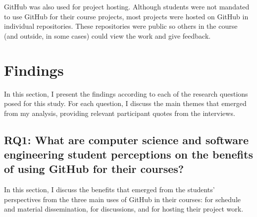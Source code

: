 GitHub was also used for project hosting. Although students were not mandated to use GitHub for their course projects, most projects were hosted on GitHub in individual repositories. These repositories were public so others in the course (and outside, in some cases) could view the work and give feedback. %

\section{Findings}

In this section, I present the findings according to each of the research questions posed for this study. For each question, I discuss the main themes that emerged from my analysis, providing relevant participant quotes from the interviews.




\subsection{RQ1: What are computer science and software engineering student perceptions on the benefits of using GitHub for their courses?}
In this section, I discuss the benefits that emerged from the students' perspectives from the three main uses of GitHub in their courses: for schedule and material dissemination, for discussions, and for hosting their project work. \\ %

